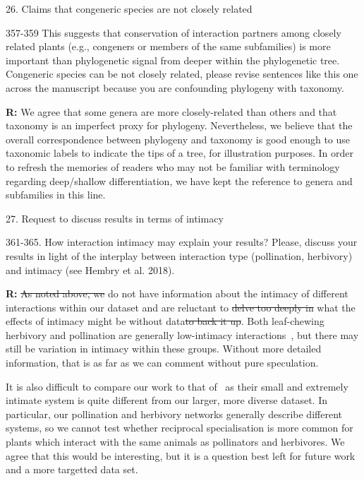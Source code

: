 \documentclass[12pt]{letter}
\newenvironment{refquote}{\bigskip \begin{it}}{\end{it}\smallskip}
\providecommand{\DIFadd}[1]{{\protect\color{blue}\uwave{#1}}} %
\providecommand{\DIFdel}[1]{{\protect\color{red}\sout{#1}}}                      %
\providecommand{\DIFaddbegin}{} %
\providecommand{\DIFaddend}{} %
\providecommand{\DIFdelbegin}{} %
\providecommand{\DIFdelend}{} %
\newcommand{\DIFscaledelfig}{0.5}
\newlength{\DIFdelgraphicswidth} %
\newlength{\DIFdelgraphicsheight} %
\newcommand{\DIFaddincludegraphics}[2][]{{\color{blue}\fbox{\DIFOincludegraphics[#1]{#2}}}} %
\newcommand{\DIFdelincludegraphics}[2][]{%
\sbox{\DIFdelgraphicsbox}{\DIFOincludegraphics[#1]{#2}}%
\settoboxwidth{\DIFdelgraphicswidth}{\DIFdelgraphicsbox} %
\settoboxtotalheight{\DIFdelgraphicsheight}{\DIFdelgraphicsbox} %
\scalebox{\DIFscaledelfig}{%
\parbox[b]{\DIFdelgraphicswidth}{\usebox{\DIFdelgraphicsbox}\\[-\baselineskip] \rule{\DIFdelgraphicswidth}{0em}}\llap{\resizebox{\DIFdelgraphicswidth}{\DIFdelgraphicsheight}{%
\setlength{\unitlength}{\DIFdelgraphicswidth}%
\begin{picture}(1,1)%
\thicklines\linethickness{2pt} %
{\color[rgb]{1,0,0}\put(0,0){\framebox(1,1){}}}%
{\color[rgb]{1,0,0}\put(0,0){\line( 1,1){1}}}%
{\color[rgb]{1,0,0}\put(0,1){\line(1,-1){1}}}%
\end{picture}%
}\hspace*{3pt}}} %
} %
\DeclareRobustCommand{\DIFaddbegin}{\DIFOaddbegin \let\includegraphics\DIFaddincludegraphics} %
\DeclareRobustCommand{\DIFaddend}{\DIFOaddend \let\includegraphics\DIFOincludegraphics} %
\DeclareRobustCommand{\DIFdelbegin}{\DIFOdelbegin \let\includegraphics\DIFdelincludegraphics} %
\DeclareRobustCommand{\DIFdelend}{\DIFOaddend \let\includegraphics\DIFOincludegraphics} %
\begin{document}
	26. Claims that congeneric species are not closely related 

		\begin{refquote}
			357-359 This suggests that conservation of interaction partners among closely related plants (e.g., congeners or members of the same subfamilies) is more important than phylogenetic signal from deeper within the phylogenetic tree. Congeneric species can be not closely related, please revise sentences like this one across the manuscript because you are confounding phylogeny with taxonomy.
		\end{refquote}


		\textbf{R:} We agree that some genera are more closely-related than others and that taxonomy is an imperfect proxy for phylogeny. Nevertheless, we believe that the overall correspondence between phylogeny and taxonomy is good enough to use taxonomic labels to indicate the tips of a tree, for illustration purposes. In order to refresh the memories of readers who may not be familiar with terminology regarding deep/shallow differentiation, we have kept the reference to genera and subfamilies in this line.



	27. Request to discuss results in terms of intimacy 

		\begin{refquote}
			361-365. How interaction intimacy may explain your results? Please, discuss your results in light of the interplay between interaction type (pollination, herbivory) and intimacy (see Hembry et al. 2018).
		\end{refquote}


		\textbf{R:} \DIFdelbegin \DIFdel{As noted above, we }\DIFdelend \DIFaddbegin \DIFadd{We }\DIFaddend do not have information about the intimacy of different interactions within our dataset and are reluctant to \DIFdelbegin \DIFdel{delve too deeply in }\DIFdelend \DIFaddbegin \DIFadd{speculate about }\DIFaddend what the effects of intimacy might be without data\DIFdelbegin \DIFdel{to back it up}\DIFdelend . Both leaf-chewing herbivory and pollination are generally low-intimacy interactions~\citep{Astegiano2017}, but there may still be variation in intimacy within these groups. Without more detailed information, that is as far as we can comment without pure speculation. 


		It is also difficult to compare our work to that of~\citet{Hembry2018} as their small and extremely intimate system is quite different from our larger, more diverse dataset. In particular, our pollination and herbivory networks generally describe different systems, so we cannot test whether reciprocal specialisation is more common for plants which interact with the same animals as pollinators and herbivores. We agree that this would be interesting, but it is a question best left for future work and a more targetted data set.
\end{document}

